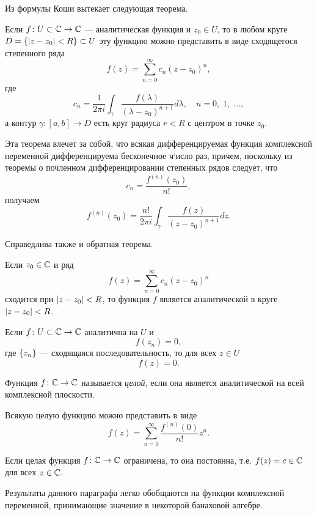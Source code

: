 Из формулы Коши вытекает следующая теорема.
\begin{theorem}\label{th:analytic}
    Если $f \colon U \subset \mathbb{C} \to \mathbb{C}$ --- аналитическая функция и $z_0 \in U$,
    то в любом круге $D = \left\{\left|z-z_0\right| < R\right\} \subset U$ эту функцию можно представить в
    виде сходящегося степенного ряда
    \[ f(z) = \sum_{n=0}^\infty c_n (z - z_0)^n, \]
    где 
    \[ c_n = \dfrac{1}{2\pi i} \int_\gamma \dfrac{f(\lambda)}{(\lambda - z_0)^{n+1}} d \lambda,
        \quad n = 0,\; 1,\; \dotsc, \]
    а контур $\gamma \colon [a, b] \to D$ есть круг радиуса $r < R$ с центром в точке $z_0$. 
\end{theorem}

Эта теорема влечет за собой, что всякая дифференцируемая функция комплексной переменной
дифференцируема бесконечное ч`исло раз, причем, поскольку
из теоремы о почленном дифференцировании степенных рядов следует, что
\[ c_n = \frac{f^{(n)}(z_0)}{n!}, \]
получаем
\[ f^{(n)}(z_0) = \dfrac{n!}{2\pi i} 
    \int_\gamma \dfrac{f(z)}{(z - z_0)^{n+1}} d z. \]

Справедлива также и обратная теорема.
\begin{theorem}\label{th:tayloranalytic}
    Если $z_0 \in \mathbb{C}$ и ряд
    \[ f(z) = \sum_{n=0}^\infty c_n (z - z_0)^n \]
    сходится при $\left|z-z_0\right| < R$,
    то функция $f$ является аналитической в круге $\left|z - z_0\right| < R$.
\end{theorem}

\begin{theorem}[единственности]
    Если $f \colon U \subset \mathbb{C} \to \mathbb{C}$ аналитична на $U$ и
    \[ f(z_n) = 0, \]
    где $\left\{z_n\right\}$ --- сходящаяся последовательность, то для всех $z \in U$
    \[ f(z) = 0. \]
\end{theorem}

\begin{definition}
    Функция $f \colon \mathbb{C} \to \mathbb{C}$ называется \emph{целой}, если
    она является аналитической на всей комплексной плоскости.
\end{definition}

Всякую целую функцию можно представить в виде
\[ f(z) = \sum_{n=0}^\infty \frac{f^{(n)}(0)}{n!} z^n. \]

\begin{theorem}[Лиувилля]\label{th:liouville}
    Если целая функция $f \colon \mathbb{C} \to \mathbb{C}$ ограничена, то она постоянна, 
    т.е. $f(z) = c \in \mathbb{C}$ для всех $z \in \mathbb{C}$.
\end{theorem}

Результаты данного параграфа легко обобщаются на функции комплексной переменной, принимающие
значение в некоторой банаховой алгебре.
